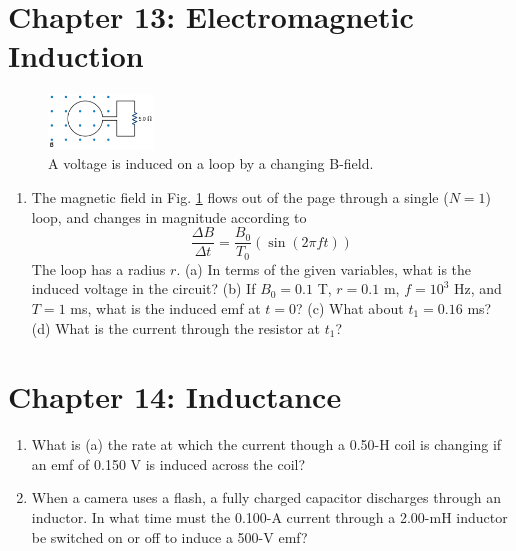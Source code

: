 \documentclass[10pt]{article}
\begin{document}
\section{Chapter 13: Electromagnetic Induction}

\begin{figure}[hb]
\centering
\includegraphics[width=0.25\textwidth]{loopsine.png}
\caption{\label{fig:chap13_1} A voltage is induced on a loop by a changing B-field.}
\end{figure}

\begin{enumerate}
\item The magnetic field in Fig. \ref{fig:chap13_1} flows out of the page through a single ($N=1$) loop, and changes in magnitude according to
\begin{equation}
\frac{\Delta B}{\Delta t} = \frac{B_0}{T_0}\left(\sin(2\pi f t)\right)
\end{equation}
The loop has a radius $r$.  (a) In terms of the given variables, what is the induced voltage in the circuit? (b) If $B_0 = 0.1$ T, $r = 0.1$ m, $f = 10^3$ Hz, and $T = 1$ ms, what is the induced emf at $t=0$?  (c) What about $t_1 = 0.16$ ms? (d) What is the current through the resistor at $t_1$? \\ \vspace{3cm}
\end{enumerate}

\section{Chapter 14: Inductance}

\begin{enumerate}
\item What is (a) the rate at which the current though a 0.50-H coil is changing if an emf of 0.150 V is induced across the coil? \\ \vspace{1cm}
\item When a camera uses a flash, a fully charged capacitor discharges through an inductor. In what time must the 0.100-A current through a 2.00-mH inductor be switched on or off to induce a 500-V emf?
\end{enumerate}
\end{document}
